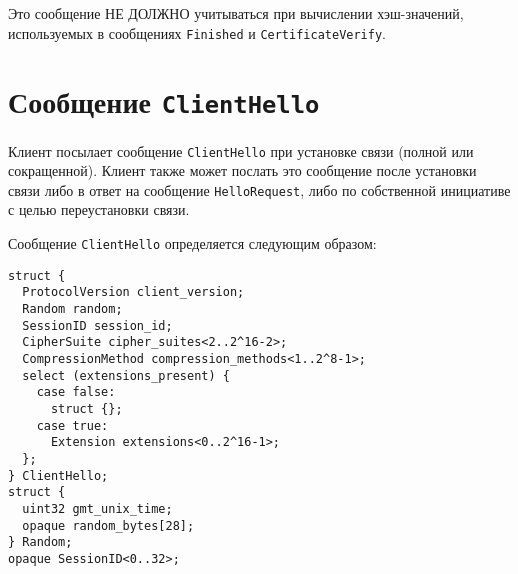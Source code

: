 Это сообщение НЕ ДОЛЖНО учитываться при вычислении хэш-значений, 
используемых в сообщениях \lstinline{Finished} и 
\lstinline{CertificateVerify}. 

\section{Сообщение \lstinline{ClientHello}}\label{HANDSHAKE.5}

Клиент посылает сообщение \lstinline{ClientHello} при установке связи
(полной или сокращенной).
Клиент также может послать это сообщение после установки связи либо в ответ
на сообщение \lstinline{HelloRequest}, либо по собственной инициативе с
целью переустановки связи.

Сообщение \lstinline{ClientHello} определяется следующим образом:
\begin{lstlisting}
struct {
  ProtocolVersion client_version;
  Random random;
  SessionID session_id;
  CipherSuite cipher_suites<2..2^16-2>;
  CompressionMethod compression_methods<1..2^8-1>;
  select (extensions_present) {
    case false:
      struct {};
    case true:
      Extension extensions<0..2^16-1>;
  };
} ClientHello;
struct {
  uint32 gmt_unix_time;
  opaque random_bytes[28];
} Random;
opaque SessionID<0..32>;
\end{lstlisting}

